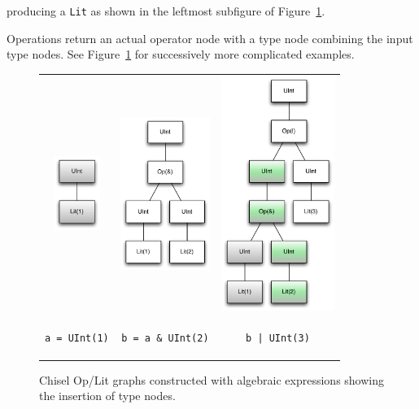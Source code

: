 \documentclass[10pt,twocolumn]{article}
\newcommand{\kode}[1]{\begin{footnotesize}{\tt #1}\end{footnotesize}}
\def\code#1{{\small\tt #1}}
\begin{document}
\noindent
producing a \code{Lit} as shown in the
leftmost subfigure of Figure~\ref{fig:bits-expressions}.

Operations return an actual operator node with a type node combining
the input type nodes.  See Figure~\ref{fig:bits-expressions} for
successively more complicated examples.

\begin{figure}
\begin{center}
\begin{tabular}{ccc}
\includegraphics[height=0.94in]{figs/bits-1.pdf} &
\includegraphics[height=1.96in]{figs/bits-and.pdf} &
\includegraphics[height=3.0in]{figs/bits-or-and.pdf} \\
\kode{a = UInt(1)} & \kode{b = a \& UInt(2)} &
\kode{b | UInt(3)} \\
\end{tabular}
\end{center}
\caption{Chisel Op/Lit graphs constructed with algebraic expressions
  showing the insertion of type nodes.}
\label{fig:bits-expressions}
\end{figure}
\end{document}
